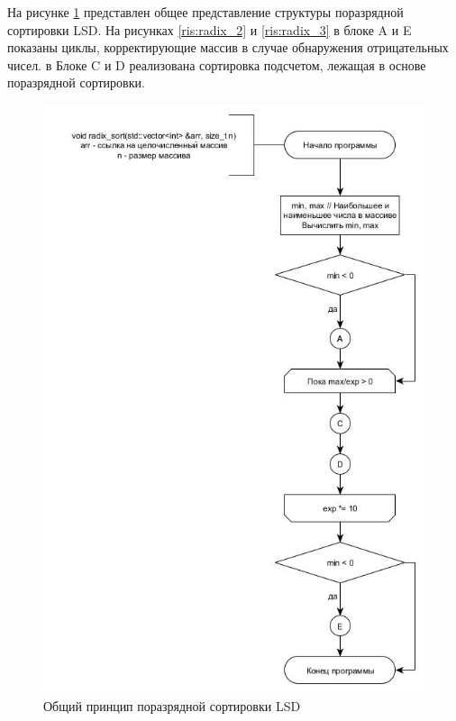 \documentclass[a4paper, 14pt]{article}
\begin{document}
\vspace{300pt}

На рисунке \ref{ris:radix_1} представлен общее представление структуры поразрядной сортировки LSD. На рисунках \ref{ris:radix_2} и \ref{ris:radix_3} в блоке A и E показаны циклы, корректирующие массив в случае обнаружения отрицательных чисел. в Блоке C и D реализована сортировка подсчетом, лежащая в основе поразрядной сортировки.

\vspace{300pt}
	
\begin{figure}[h!]
\centering
\center\includegraphics[scale=0.5]{radix_1.jpg}
\caption{Общий принцип поразрядной сортировки LSD}
\label{ris:radix_1}
\end{figure}
\end{document}
